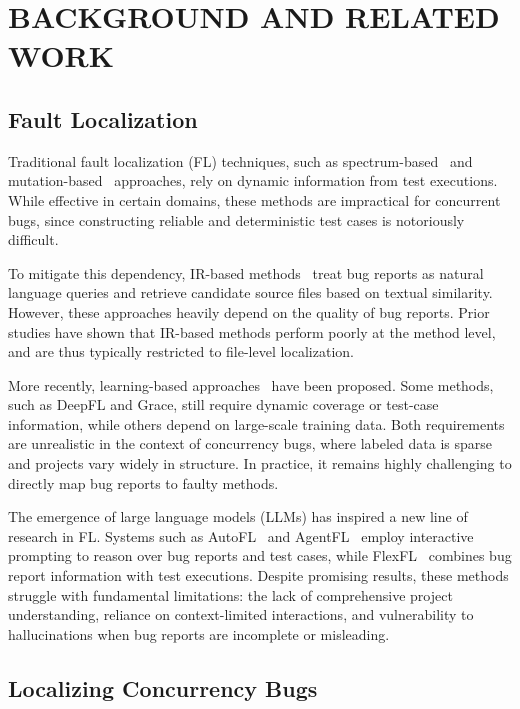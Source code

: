 \section{BACKGROUND AND RELATED WORK}

\subsection{Fault Localization}
Traditional fault localization (FL) techniques, such as spectrum-based~\cite{sp1,sp2} and mutation-based~\cite{m1, m2} approaches, rely on dynamic information from test executions. While effective in certain domains, these methods are impractical for concurrent bugs, since constructing reliable and deterministic test cases is notoriously difficult.

To mitigate this dependency, IR-based methods~\cite{yu2008empirical,jones2005empirical,chilimbi2009holmes,santelices2009lightweight, shao2023information} treat bug reports as natural language queries and retrieve candidate source files based on textual similarity. However, these approaches heavily depend on the quality of bug reports. Prior studies have shown that IR-based methods perform poorly at the method level, and are thus typically restricted to file-level localization.

More recently, learning-based approaches~\cite{dl1,dl2} have been proposed. Some methods, such as DeepFL and Grace, still require dynamic coverage or test-case information, while others depend on large-scale training data. Both requirements are unrealistic in the context of concurrency bugs, where labeled data is sparse and projects vary widely in structure. In practice, it remains highly challenging to directly map bug reports to faulty methods.

The emergence of large language models (LLMs) has inspired a new line of research in FL. Systems such as AutoFL~\cite{autofl} and AgentFL~\cite{agentfl} employ interactive prompting to reason over bug reports and test cases, while FlexFL~\cite{flexfl} combines bug report information with test executions. Despite promising results, these methods struggle with fundamental limitations: the lack of comprehensive project understanding, reliance on context-limited interactions, and vulnerability to hallucinations when bug reports are incomplete or misleading.


\subsection{Localizing Concurrency Bugs}

